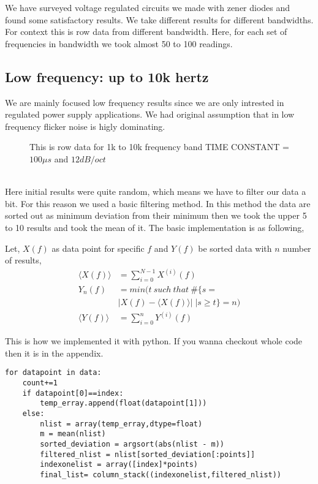 
We have surveyed voltage regulated circuits we made with zener diodes and found some satisfactory results. We take different results for different bandwidths. For context this is row data from different bandwidth. Here, for each set of frequencies in bandwidth we took almost 50 to 100 readings.


\subsection{Low frequency: up to 10k hertz}

We are mainly focused low frequency results since we are only intrested in regulated power supply applications. We had original assumption that in low frequency flicker noise is higly dominating.\cite{harris2020array}\cite{Hunter:2007}

\begin{figure}[hbt!]
\caption{This is row data for 1k to 10k frequency band TIME CONSTANT = $100\mu s$ and $12dB/oct$}
\end{figure}\\

Here initial results were quite random, which means we have to filter our data a bit. For this reason we used a basic filtering method. In this method the data are sorted out as minimum deviation from their minimum then we took the upper 5 to 10 results and took the mean of it. The basic implementation is as following,

Let, $X(f)$ as data point for specific $f$ and $Y(f)$ be sorted data with $n$ number of results,
\begin{align*}
\langle X(f) \rangle & = \sum_{i=0}^{N-1} X^{(i)}(f)\\
Y_n(f) & = min(t\: such\: that\: \# \{ s =\\
&   \lvert X(f)- \langle X(f)\rangle \rvert \;| s \geq t \} =n)\\
\langle Y(f) \rangle & = \sum_{i=0}^{n} Y^{(i)}(f)
\end{align*}

This is how we implemented it with python. If you wanna checkout whole code then it is in the appendix.

\begin{verbatim}
for datapoint in data:
    count+=1
    if datapoint[0]==index:
        temp_erray.append(float(datapoint[1]))
    else:
        nlist = array(temp_erray,dtype=float)
        m = mean(nlist)
        sorted_deviation = argsort(abs(nlist - m))
        filtered_nlist = nlist[sorted_deviation[:points]]
        indexonelist = array([index]*points)
        final_list= column_stack((indexonelist,filtered_nlist))

\end{verbatim}

